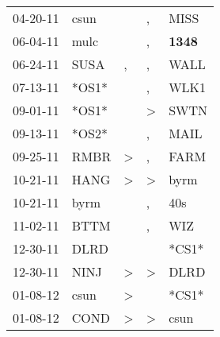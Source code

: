 \begin{supertabular}{p{0.07\textwidth}p{0.06\textwidth}p{0.02\textwidth}p{0.02\textwidth}p{0.06\textwidth}}
          04-20-11\textsuperscript{} &           csun\textsuperscript{} &                  &                , &           MISS\textsuperscript{} \\
          06-04-11\textsuperscript{} &           mulc\textsuperscript{} &                  &                , &  \textbf{1348\textsuperscript{}} \\
          06-24-11\textsuperscript{} &           SUSA\textsuperscript{} &                , &                , &           WALL\textsuperscript{} \\
          07-13-11\textsuperscript{} &                            *OS1* &                  &                , &           WLK1\textsuperscript{} \\
          09-01-11\textsuperscript{} &                            *OS1* &                  &     \textgreater &           SWTN\textsuperscript{} \\
          09-13-11\textsuperscript{} &                            *OS2* &                  &                , &           MAIL\textsuperscript{} \\
          09-25-11\textsuperscript{} &           RMBR\textsuperscript{} &     \textgreater &                , &           FARM\textsuperscript{} \\
          10-21-11\textsuperscript{} &           HANG\textsuperscript{} &     \textgreater &     \textgreater &           byrm\textsuperscript{} \\
          10-21-11\textsuperscript{} &           byrm\textsuperscript{} &                  &                , &            40s\textsuperscript{} \\
          11-02-11\textsuperscript{} &           BTTM\textsuperscript{} &                  &                , &            WIZ\textsuperscript{} \\
          12-30-11\textsuperscript{} &           DLRD\textsuperscript{} &                  &                  &                            *CS1* \\
          12-30-11\textsuperscript{} &           NINJ\textsuperscript{} &     \textgreater &     \textgreater &           DLRD\textsuperscript{} \\
          01-08-12\textsuperscript{} &           csun\textsuperscript{} &     \textgreater &                  &                            *CS1* \\
          01-08-12\textsuperscript{} &           COND\textsuperscript{} &     \textgreater &     \textgreater &           csun\textsuperscript{} \\

\end{supertabular}

